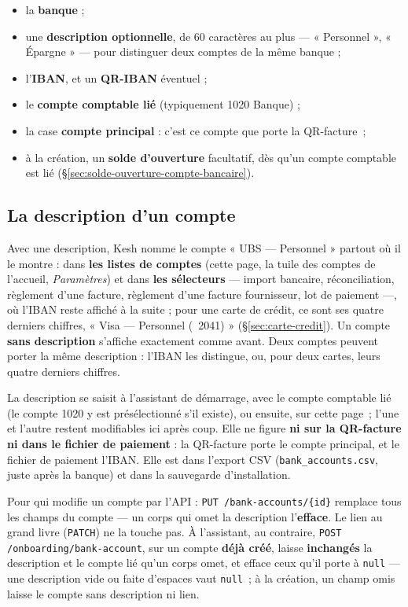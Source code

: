 \documentclass[a4paper,11pt,oneside]{article}
\begin{document}
\begin{itemize}
    \item la \textbf{banque} ;
    \item une \textbf{description optionnelle}, de 60 caractères au plus --- « Personnel », « Épargne » --- pour distinguer deux comptes de la même banque ;
    \item l'\textbf{IBAN}, et un \textbf{QR-IBAN} éventuel ;
    \item le \textbf{compte comptable lié} (typiquement 1020 Banque) ;
    \item la case \textbf{compte principal} : c'est ce compte que porte la QR-facture~;
    \item à la création, un \textbf{solde d'ouverture} facultatif, dès qu'un compte comptable est lié (\S\ref{sec:solde-ouverture-compte-bancaire}).
\end{itemize}

\subsection{La description d'un compte}

Avec une description, Kesh nomme le compte « UBS --- Personnel » partout où il le montre : dans \textbf{les listes de comptes} (cette page, la tuile des comptes de l'accueil, \emph{Paramètres}) et dans \textbf{les sélecteurs} --- import bancaire, réconciliation, règlement d'une facture, règlement d'une facture fournisseur, lot de paiement ---, où l'IBAN reste affiché à la suite ; pour une carte de crédit, ce sont ses quatre derniers chiffres, « Visa --- Personnel (\textbullet\textbullet\textbullet\textbullet~2041) » (\S\ref{sec:carte-credit}). Un compte \textbf{sans description} s'affiche exactement comme avant. Deux comptes peuvent porter la même description : l'IBAN les distingue, ou, pour deux cartes, leurs quatre derniers chiffres.

La description se saisit à l'assistant de démarrage, avec le compte comptable lié (le compte 1020 y est présélectionné s'il existe), ou ensuite, sur cette page~; l'une et l'autre restent modifiables ici après coup. Elle ne figure \textbf{ni sur la QR-facture ni dans le fichier de paiement} : la QR-facture porte le compte principal, et le fichier de paiement l'IBAN. Elle est dans l'export CSV (\texttt{bank\_accounts.csv}, juste après la banque) et dans la sauvegarde d'installation.

\begin{keshnote}
Pour qui modifie un compte par l'API : \texttt{PUT /bank-accounts/\{id\}} remplace tous les champs du compte --- un corps qui omet la description l'\textbf{efface}. Le lien au grand livre (\texttt{PATCH}) ne la touche pas. À l'assistant, au contraire, \texttt{POST /onboarding/bank-account}, sur un compte \textbf{déjà créé}, laisse \textbf{inchangés} la description et le compte lié qu'un corps omet, et efface ceux qu'il porte à \texttt{null} --- une description vide ou faite d'espaces vaut \texttt{null}~; à la création, un champ omis laisse le compte sans description ni lien.
\end{keshnote}
\end{document}
